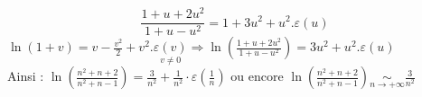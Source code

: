 {\begin{enumerate}
{		$$
		\frac{1+u+2 u^{2}}{1+u-u^{2}}=1+3 u^{2}+u^{2} . \varepsilon(u)
		$$
		$\ln (1+v)=v-\frac{v^{2}}{2}+v^{2} . \underset{v \neq 0}{\varepsilon(v)} \Rightarrow \ln \left(\frac{1+u+2 u^{2}}{1+u-u^{2}}\right)=3 u^{2}+u^{2} . \varepsilon(u)$\\
		Ainsi : $\ln \left(\frac{n^{2}+n+2}{n^{2}+n-1}\right)=\frac{3}{n^{2}}+\frac{1}{n^{2}} \cdot \varepsilon\left(\frac{1}{n}\right)$ ou encore $\ln \left(\frac{n^{2}+n+2}{n^{2}+n-1}\right) \underset{n \rightarrow+\infty}{\sim} \frac{3}{n^{2}}$}
\end{enumerate}
}

